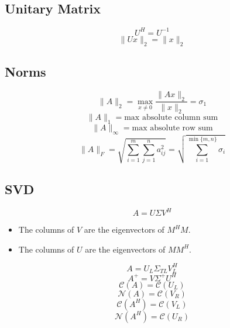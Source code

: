 \documentclass[letterpaper,10pt]{article}
\providecommand{\norm}[1]{\lVert#1\rVert}
\begin{document}
\begin{multicols}{3}
\subsection*{Unitary Matrix}
\begin{equation*}
U^H=U^{-1}
\end{equation*}
\begin{equation*}
\norm{Ux}_2=\norm{x}_2
\end{equation*}
\subsection*{Norms}
\begin{equation*}
\norm{A}_2=\max_{x\neq0}\frac{\norm{Ax}_2}{\norm{x}_2}=\sigma_1
\end{equation*}
\begin{equation*}
\norm{A}_1=\text{max absolute column sum}
\end{equation*}
\begin{equation*}
\norm{A}_\infty=\text{max absolute row sum}
\end{equation*}
\begin{equation*}
\norm{A}_F=\sqrt{\sum_{i=1}^m\sum_{j=1}^n a_{ij}^2}
=\sqrt{\sum_{i=1}^{\min\{m,n\}}\sigma_i}
\end{equation*}
\subsection*{SVD}
\begin{equation*}
A=U\Sigma V^H
\end{equation*}
\begin{itemize}
\item The columns of $V$ are the eigenvectors of $M^H M$.
\item The columns of $U$ are the eigenvectors of $MM^H$.
\end{itemize}
\begin{equation*}
A=U_L\Sigma_{TL} V_L^H
\end{equation*}
\begin{equation*}
A^{+}=V\Sigma^{+} U^H
\end{equation*}
\begin{equation*}
\mathcal{C}(A)=\mathcal{C}(U_L)
\end{equation*}
\begin{equation*}
\mathcal{N}(A)=\mathcal{C}(V_R)
\end{equation*}
\begin{equation*}
\mathcal{C}(A^H)=\mathcal{C}(V_L)
\end{equation*}
\begin{equation*}
\mathcal{N}(A^H)=\mathcal{C}(U_R)
\end{equation*}

\end{multicols}
\end{document}
